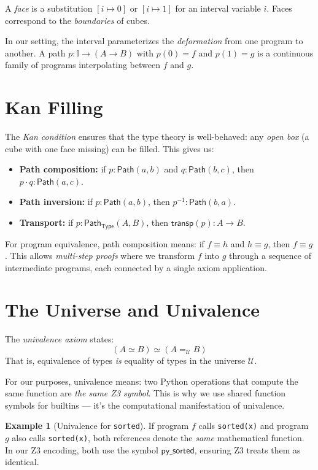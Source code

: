 \documentclass[11pt,a4paper]{report}
\theoremstyle{definition}
\newtheorem{example}[definition]{Example}
\theoremstyle{plain}
\newcommand{\Path}{\mathsf{Path}}
\newcommand{\Type}{\mathsf{Type}}
\begin{document}
A \emph{face} is a substitution $[i \mapsto 0]$ or $[i \mapsto 1]$ for
an interval variable $i$.  Faces correspond to the \emph{boundaries} of
cubes.

In our setting, the interval parameterizes the \emph{deformation} from
one program to another.  A path $p : \mathbb{I} \to (A \to B)$ with
$p(0) = f$ and $p(1) = g$ is a continuous family of programs
interpolating between $f$ and $g$.

\section{Kan Filling}

The \emph{Kan condition} ensures that the type theory is well-behaved:
any \emph{open box} (a cube with one face missing) can be filled.
This gives us:

\begin{itemize}
  \item \textbf{Path composition:} if $p : \Path(a, b)$ and
    $q : \Path(b, c)$, then $p \cdot q : \Path(a, c)$.
  \item \textbf{Path inversion:} if $p : \Path(a, b)$, then
    $p^{-1} : \Path(b, a)$.
  \item \textbf{Transport:} if $p : \Path_{\Type}(A, B)$, then
    $\mathsf{transp}(p) : A \to B$.
\end{itemize}

For program equivalence, path composition means: if $f \equiv h$ and
$h \equiv g$, then $f \equiv g$.  This allows \emph{multi-step proofs}
where we transform $f$ into $g$ through a sequence of intermediate
programs, each connected by a single axiom application.

\section{The Universe and Univalence}

The \emph{univalence axiom} states:
\[
  (A \simeq B) \simeq (A =_{\mathcal{U}} B)
\]
That is, equivalence of types \emph{is} equality of types in the
universe $\mathcal{U}$.

For our purposes, univalence means: two Python operations that compute
the same function are \emph{the same Z3 symbol}.  This is why we use
shared function symbols for builtins --- it's the computational
manifestation of univalence.

\begin{example}[Univalence for \texttt{sorted}]
If program $f$ calls \texttt{sorted(x)} and program $g$ also calls
\texttt{sorted(x)}, both references denote the \emph{same} mathematical
function.  In our Z3 encoding, both use the symbol $\mathsf{py\_sorted}$,
ensuring Z3 treats them as identical.
\end{example}
\end{document}

